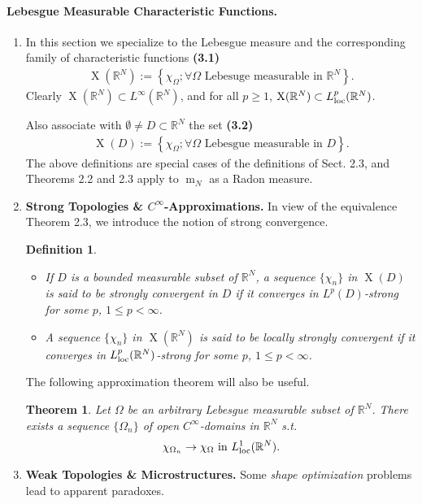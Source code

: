 \documentclass{book}
\numberwithin{equation}{section}
\newtheorem{definition}{Definition}[section]
\newtheorem{theorem}{Theorem}[section]
\begin{document}
\paragraph{Lebesgue Measurable Characteristic Functions.}
\begin{enumerate}
    \item In this section we specialize to the Lebesgue measure and the corresponding family of characteristic functions \textbf{(3.1)}
    \begin{align*}
        \operatorname{X}(\mathbb{R}^N) := \left\{\chi_\Omega;\forall\Omega \mbox{ Lebesuge measurable in } \mathbb{R}^N\right\}.
    \end{align*}
    Clearly $\operatorname{X}(\mathbb{R}^N)\subset L^\infty(\mathbb{R}^N)$, and for all $p\ge 1$, $\operatorname{X}(\mathbb{R}^N)\subset L_{\rm loc}^p(\mathbb{R}^N)$.
    
    Also associate with $\emptyset\ne D\subset\mathbb{R}^N$ the set \textbf{(3.2)}
    \begin{align*}
        \operatorname{X}(D) := \left\{\chi_\Omega;\forall\Omega \mbox{ Lebesgue measurable in } D\right\}.
    \end{align*}
    The above definitions are special cases of the definitions of Sect. 2.3, and Theorems 2.2 and 2.3 apply to $\operatorname{m}_N$ as a Radon measure.
    \item \textbf{Strong Topologies \& $C^\infty$-Approximations.} In view of the equivalence Theorem 2.3, we introduce the notion of strong convergence.
    
    \begin{definition}
        \begin{itemize}
            \item[(i)] If $D$ is a bounded measurable subset of $\mathbb{R}^N$, a sequence $\{\chi_n\}$ in $\operatorname{X}(D)$ is said to be \emph{strongly convergent} in $D$ if it converges in $L^p(D)$-strong for some $p$, $1\le p < \infty$.
            \item[(ii)] A sequence $\{\chi_n\}$ in $\operatorname{X}(\mathbb{R}^N)$ is said to be \emph{locally strongly convergent} if it converges in $L_{\rm loc}^p(\mathbb{R}^N)$-strong for some $p$, $1\le p < \infty$.
        \end{itemize}
    \end{definition}
    The following approximation theorem will also be useful.
    
    \begin{theorem}
        Let $\Omega$ be an arbitrary Lebesgue measurable subset of $\mathbb{R}^N$. There exists a sequence $\{\Omega_n\}$ of open $C^\infty$-domains in $\mathbb{R}^N$ s.t.
        \begin{align*}
            \chi_{\Omega_n}\to\chi_\Omega \mbox{ in } L_{\rm loc}^1(\mathbb{R}^N).
        \end{align*}
    \end{theorem}
    \item \textbf{Weak Topologies \& Microstructures.} Some \textit{shape optimization} problems lead to apparent paradoxes.
    

\end{enumerate}
\end{document}
